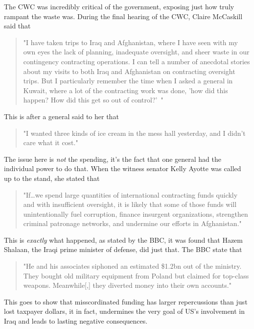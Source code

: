 \documentclass{article}
\begin{document}
        The CWC was incredibly critical of the government, exposing just how truly rampant the waste was. During the final hearing of the CWC, Claire McCaskill said that 
        \begin{quote}
            "I have taken trips to Iraq and Afghanistan, where I have seen with my own eyes the lack of planning, inadequate oversight, and sheer waste in our contingency contracting operations. I can tell a number of anecdotal stories about my visits to both Iraq and Afghanistan on contracting oversight trips. But I particularly remember the time when I asked a general in Kuwait, where a lot of the contracting work was done, 'how did this happen? How did this get so out of control?'~\parencite{us_senate2011wartime_contracting}"
        \end{quote}
        This is after a general said to her that 
        \begin{quote}
            "I wanted three kinds of ice cream in the mess hall yesterday, and I didn't care what it cost."~\parencite{us_senate2011wartime_contracting}
        \end{quote}
        The issue here is \textit{not} the spending, it's the fact that one general had the individual power to do that. 
        When the witness senator Kelly Ayotte was called up to the stand, she stated that \begin{quote}
            "If\ldots we spend large quantities of international contracting funds quickly and with insufficient oversight, it is likely  that some of those funds will unintentionally fuel corruption, finance insurgent organizations, strengthen criminal patronage networks, and undermine our efforts in Afghanistan." \parencite{us_senate2011wartime_contracting}
        \end{quote}
        This is \textit{exactly} what happened, as stated by the BBC, it was found that Hazem Shalaan, the Iraqi prime minister of defense, did just that. The BBC state that
        \begin{quote}
            "He and his associates siphoned an estimated \$1.2bn out of the ministry. They bought old military equipment from Poland but claimed for top-class weapons. Meanwhile[,] they diverted money into their own accounts."
        \end{quote}
        This goes to show that misscordinated funding has larger repercussions than just lost taxpayer dollars, it in fact, undermines the very goal of US's involvement in Iraq and leads to lasting negative consequences. 
\end{document}
